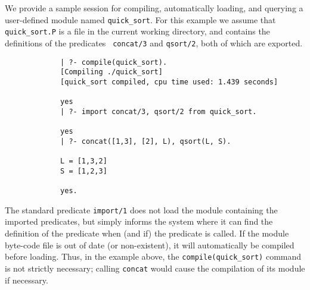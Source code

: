 

We provide a sample session for compiling, automatically loading, and
querying a user-defined module named {\tt quick\_sort}.  For this
example we assume that {\tt quick\_sort.P} is a file in the current
working directory, and contains the definitions of the predicates {\tt
  concat/3} and {\tt qsort/2}, both of which are exported.

{\footnotesize
\begin{verbatim}
             | ?- compile(quick_sort).
             [Compiling ./quick_sort]
             [quick_sort compiled, cpu time used: 1.439 seconds]

             yes
             | ?- import concat/3, qsort/2 from quick_sort. 

             yes
             | ?- concat([1,3], [2], L), qsort(L, S).

             L = [1,3,2]
             S = [1,2,3]

             yes.
\end{verbatim}
}

The standard predicate {\tt import/1} does not load the module 
containing the imported predicates, but simply informs the system 
where it can find the definition of the predicate when (and if) the
predicate is called.
If the module byte-code file is out of date (or non-existent), it will
automatically be compiled before loading.
Thus, in the example above, the {\tt compile(quick\_sort)} command is not
strictly necessary; calling {\tt concat} would cause the compilation
of its module if necessary.

